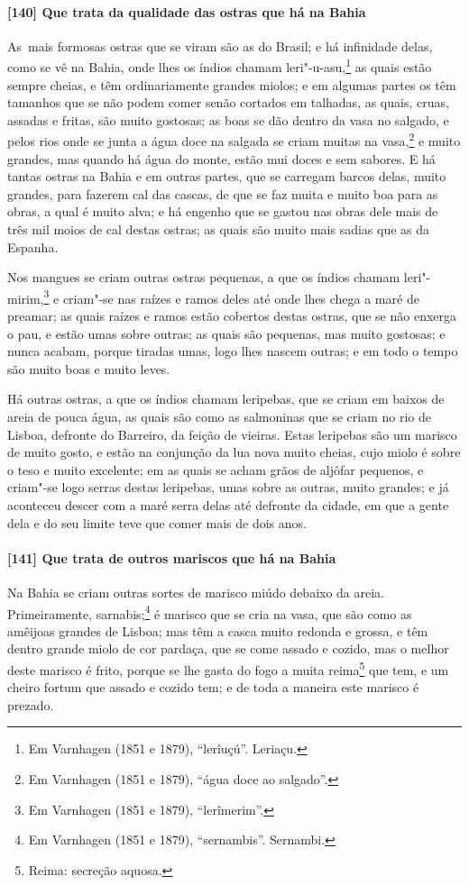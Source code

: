 \paragraph{[140] Que trata da qualidade das ostras que há na Bahia}\quad
\mbox{As mais} formosas ostras que se viram são as do Brasil; e há infinidade delas, como se vê
na Bahia, onde lhes os índios chamam leri"-u-asu,\footnote{ Em Varnhagen (1851 e 1879),
``lerîuçú''. Leriaçu.} as quais estão sempre cheias, e têm ordinariamente grandes miolos;
e em algumas partes os têm tamanhos que se não podem comer senão cortados em talhadas, as
quais, cruas, assadas e fritas, são muito gostosas; as boas se dão dentro da vasa no
salgado, e pelos rios onde se junta a água doce na salgada se criam muitas na
vasa,\footnote{ Em Varnhagen (1851 e 1879), ``água doce ao salgado''.} e muito grandes,
mas quando há água do monte, estão mui doces e sem sabores. E há tantas ostras na Bahia e
em outras partes, que se carregam barcos delas, muito grandes, para fazerem cal das
cascas, de que se faz muita e muito boa para as obras, a qual é muito alva; e há engenho
que se gastou nas obras dele mais de três mil moios de cal destas ostras; as quais são
muito mais sadias que as da Espanha.

Nos mangues se criam outras ostras pequenas, a que os índios chamam leri"-mirim,\footnote{
Em Varnhagen (1851 e 1879), ``lerîmerim''.} e criam"-se nas raízes e ramos deles até onde
lhes chega a maré de preamar; as quais raízes e ramos estão cobertos destas ostras, que se
não enxerga o pau, e estão umas sobre outras; as quais são pequenas, mas muito gostosas; e
nunca acabam, porque tiradas umas, logo lhes nascem outras; e em todo o tempo são muito
boas e muito leves.

Há outras ostras, a que os índios chamam leripebas, que se criam em baixos de areia de
pouca água, as quais são como as salmoninas que se criam no rio de Lisboa, defronte do
Barreiro, da feição de vieiras. Estas leripebas são um marisco de muito gosto, e estão na
conjunção da lua nova muito cheias, cujo miolo é sobre o teso e muito excelente; em as
quais se acham grãos de aljôfar pequenos, e criam"-se logo serras destas leripebas, umas
sobre as outras, muito grandes; e já aconteceu descer com a maré serra delas até defronte
da cidade, em que a gente dela e do seu limite teve que comer mais de dois anos.

\paragraph{[141] Que trata de outros mariscos que há na Bahia}\quad
Na Bahia se criam outras sortes de marisco miúdo debaixo da areia. Primeiramente,
sarnabis;\footnote{ Em Varnhagen (1851 e 1879), ``sernambis''. Sernambi.} é marisco que se
cria na vasa, que são como as amêijoas grandes de Lisboa; mas têm a casca muito redonda e
grossa, e têm dentro grande miolo de cor pardaça, que se come assado e cozido, mas o
melhor deste marisco é frito, porque se lhe gasta do fogo a muita reima\footnote{ Reima:
secreção aquosa.} que tem, e um cheiro fortum que assado e cozido tem; e de
toda a maneira este marisco é prezado.

